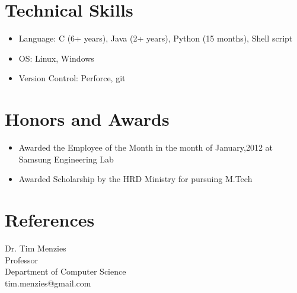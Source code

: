 \documentclass[margin,line]{res}
\begin{document}
\begin{resume}
\section{\sc Technical Skills} 
\begin{itemize}
\item Language: C (6+ years), Java (2+ years), Python (15 months), Shell script
\item OS: Linux, Windows
\item Version Control: Perforce, git
\end{itemize}

\section{\sc Honors and Awards} 
\begin{itemize}
    \item Awarded the Employee of the Month in the month of January,2012 at Samsung Engineering Lab
    \item Awarded Scholarship by the HRD Ministry for pursuing M.Tech
\end{itemize}

\section{\sc References}
Dr. Tim Menzies\\
Professor\\
Department of Computer Science\\ 
tim.menzies@gmail.com\\


\end{resume}
\end{document}
